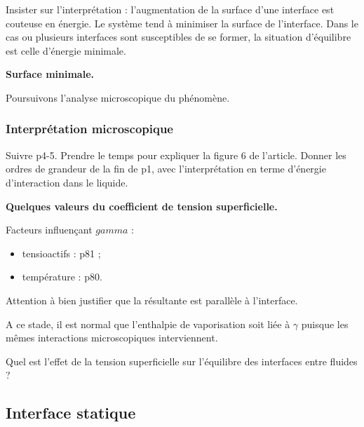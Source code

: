 Insister sur l'interprétation : l'augmentation de la surface d'une interface est couteuse en énergie.
Le système tend à minimiser la surface de l'interface.
Dans le cas ou plusieurs interfaces sont susceptibles de se former, la situation d'équilibre est celle d'énergie minimale.

\begin{slide}
\textbf{Surface minimale.}
\end{slide}

\begin{transition}
Poursuivons l'analyse microscopique du phénomène.
\end{transition}

\subsubsection{Interprétation microscopique}

Suivre \cite{Marchand2011} p4-5.
Prendre le temps pour expliquer la figure 6 de l'article.
Donner les ordres de grandeur de la fin de \cite{Marchand2011} p1, avec l'interprétation en terme d'énergie d'interaction dans le liquide.
\begin{slide}
\textbf{Quelques valeurs du coefficient de tension superficielle.}
\end{slide}

Facteurs influençant $gamma$ :
\begin{itemize}
\item tensioactifs : \cite{Rabaud2019} p81 ;
\item température : \cite{Rabaud2019} p80.
\end{itemize}

\begin{remarque}
Attention à bien justifier que la résultante est parallèle à l'interface.

\noindent
A ce stade, il est normal que l'enthalpie de vaporisation soit liée à $\gamma$ puisque les mêmes interactions microscopiques interviennent.
\end{remarque}

\begin{transition}
Quel est l'effet de la tension superficielle sur l'équilibre des interfaces entre fluides ?
\end{transition}

\subsection{Interface statique}

